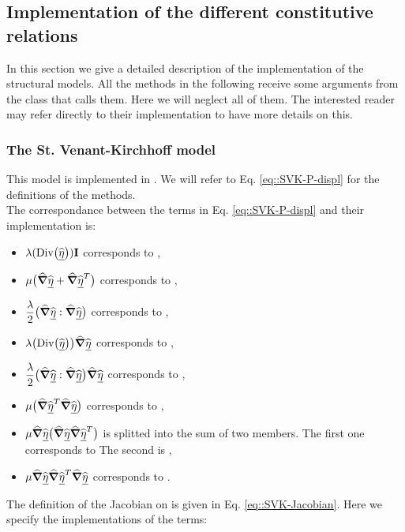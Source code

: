 \subsection{Implementation of the different constitutive relations}
In this section we give a detailed description of the implementation of the structural models. All the methods in the following receive some arguments from the class that calls them. Here we will neglect all of them. The interested reader may refer directly to their implementation to have more details on this.


\subsubsection{The St. Venant-Kirchhoff model}
This model is implemented in . We will refer to Eq. \eqref{eq::SVK-P-displ} for the definitions of the methods.\\
The correspondance between the terms in Eq. \eqref{eq::SVK-P-displ} and their implementation is:
\begin{itemize}
  \item $\displaystyle \lambda(\text{Div}\big(\widehat{\underline{\eta}}\big))\textbf{I}$ corresponds to ,
  \item $\displaystyle \mu\big(\widehat{\boldsymbol{\nabla}}\widehat{\underline{\eta}} + \widehat{\boldsymbol{\nabla}}\widehat{\underline{\eta}}^T\big)$ corresponds to ,
  \item $\displaystyle \frac{\lambda}{2}\big(\widehat{\boldsymbol{\nabla}}\widehat{\underline{\eta}}:\widehat{\boldsymbol{\nabla}}\widehat{\underline{\eta}}\big)$ corresponds to ,
  \item $\displaystyle \lambda\big(\text{Div}\big(\widehat{\underline{\eta}}\big)\big)\widehat{\boldsymbol{\nabla}}\widehat{\underline{\eta}}$ corresponds to ,
  \item $\displaystyle \frac{\lambda}{2}\big(\widehat{\boldsymbol{\nabla}}\widehat{\underline{\eta}}:\widehat{\boldsymbol{\nabla}}\widehat{\underline{\eta}}\big)\widehat{\boldsymbol{\nabla}}\widehat{\underline{\eta}}$ corresponds to ,
  \item $\displaystyle \mu\big(\widehat{\boldsymbol{\nabla}}\widehat{\underline{\eta}}^T \widehat{\boldsymbol{\nabla}}\widehat{\underline{\eta}}\big)$ corresponds to ,
  \item $\displaystyle \mu\widehat{\boldsymbol{\nabla}}\widehat{\underline{\eta}}\big(\widehat{\boldsymbol{\nabla}}\widehat{\underline{\eta}}\widehat{\boldsymbol{\nabla}}\widehat{\underline{\eta}}^T\big)$ is splitted into the sum of two members. The first one corresponds to  The second is ,
  \item $\displaystyle \mu\widehat{\boldsymbol{\nabla}}\widehat{\underline{\eta}}\widehat{\boldsymbol{\nabla}}\widehat{\underline{\eta}}^T\widehat{\boldsymbol{\nabla}}\widehat{\underline{\eta}}$ corresponds to .
\end{itemize}
The definition of the Jacobian on \Piola is given in Eq. \eqref{eq::SVK-Jacobian}. Here we specify the implementations of the terms:
